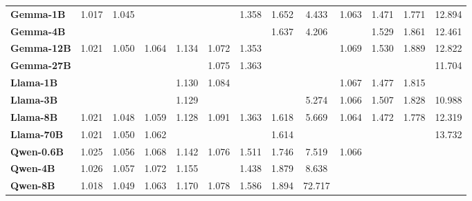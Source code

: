 \begin{tabular}{l|cccc|cccc|cccc}
\textbf{Gemma-1B} & 1.017 & 1.045 & \cellcolor{green1}{1.057} & \cellcolor{green2}{1.126} & \cellcolor{green3}{1.068} & 1.358 & 1.652 & 4.433 & 1.063 & 1.471 & 1.771 & 12.894 \\
\textbf{Gemma-4B} & \cellcolor{green5}{1.014} & \cellcolor{green5}{1.039} & \cellcolor{green4}{1.051} & \cellcolor{green1}{1.128} & \cellcolor{green1}{1.071} & \cellcolor{green3}{1.325} & 1.637 & 4.206 & \cellcolor{green1}{1.063} & 1.529 & 1.861 & 12.461 \\
\textbf{Gemma-12B} & 1.021 & 1.050 & 1.064 & 1.134 & 1.072 & 1.353 & \cellcolor{green2}{1.569} & \cellcolor{green4}{3.024} & 1.069 & 1.530 & 1.889 & 12.822 \\
\textbf{Gemma-27B} & \cellcolor{green2}{1.015} & \cellcolor{green3}{1.041} & \cellcolor{green3}{1.054} & \cellcolor{green4}{1.126} & 1.075 & 1.363 & \cellcolor{green4}{1.527} & \cellcolor{green1}{3.872} & \cellcolor{green4}{1.055} & \cellcolor{green3}{1.377} & \cellcolor{green3}{1.646} & 11.704 \\
\midrule

\textbf{Llama-1B} & \cellcolor{green1}{1.016} & \cellcolor{green4}{1.041} & \cellcolor{green5}{1.051} & 1.130 & 1.084 & \cellcolor{green2}{1.330} & \cellcolor{green1}{1.574} & \cellcolor{green2}{3.681} & 1.067 & 1.477 & 1.815 & \cellcolor{green1}{10.868} \\
\textbf{Llama-3B} & \cellcolor{green3}{1.015} & \cellcolor{green2}{1.042} & \cellcolor{green2}{1.054} & 1.129 & \cellcolor{green2}{1.070} & \cellcolor{green4}{1.312} & \cellcolor{green3}{1.544} & 5.274 & 1.066 & 1.507 & 1.828 & 10.988 \\
\textbf{Llama-8B} & 1.021 & 1.048 & 1.059 & 1.128 & 1.091 & 1.363 & 1.618 & 5.669 & 1.064 & 1.472 & 1.778 & 12.319 \\
\textbf{Llama-70B} & 1.021 & 1.050 & 1.062 & \cellcolor{green3}{1.126} & \cellcolor{green4}{1.067} & \cellcolor{green1}{1.350} & 1.614 & \cellcolor{green5}{2.620} & \cellcolor{green2}{1.060} & \cellcolor{green2}{1.422} & \cellcolor{green2}{1.716} & 13.732 \\
\midrule

\textbf{Qwen-0.6B} & 1.025 & 1.056 & 1.068 & 1.142 & 1.076 & 1.511 & 1.746 & 7.519 & 1.066 & \cellcolor{green1}{1.432} & \cellcolor{green1}{1.727} & \cellcolor{green4}{8.508} \\
\textbf{Qwen-4B} & 1.026 & 1.057 & 1.072 & 1.155 & \cellcolor{green5}{1.065} & 1.438 & 1.879 & 8.638 & \cellcolor{green3}{1.057} & \cellcolor{green4}{1.357} & \cellcolor{green4}{1.610} & \cellcolor{green5}{7.787} \\
\textbf{Qwen-8B} & 1.018 & 1.049 & 1.063 & 1.170 & 1.078 & 1.586 & 1.894 & 72.717 & \cellcolor{green5}{1.051} & \cellcolor{green5}{1.288} & \cellcolor{green5}{1.465} & \cellcolor{green3}{8.996} \\

\bottomrule
\end{tabular}